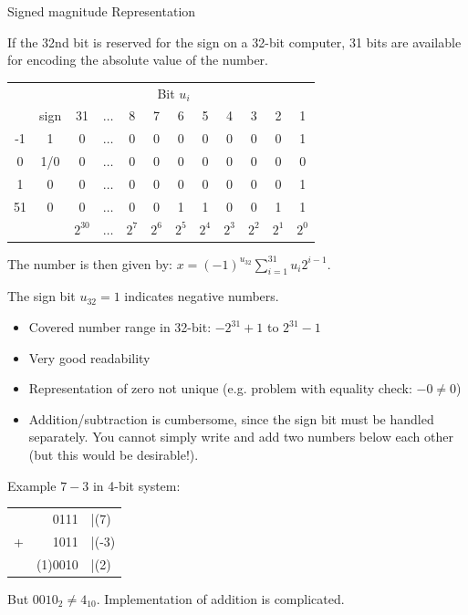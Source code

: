 \begin{vbframe}{Signed magnitude Representation}



If the 32nd bit is reserved for the sign on a 32-bit computer, 31 bits are available for encoding the absolute value of the number.

\begin{footnotesize}
\begin{center}
  \begin{tabular}{ c | ccccccccccc}
    & \multicolumn{11}{c}{Bit $u_i$} \\
    & sign & 31  & $\hdots$ & 8 & 7 & 6 & 5 & 4 & 3 & 2 & 1 \\
    \hline
    -1 & 1 & 0 & $\hdots$ & 0 & 0 & 0 & 0 & 0 & 0 & 0 & 1 \\
     0 & 1/0 & 0 & $\hdots$ & 0 & 0 & 0 & 0 & 0 & 0 & 0 & 0 \\
     1 & 0 & 0 & $\hdots$ & 0 & 0 & 0 & 0 & 0 & 0 & 0 & 1 \\
    51 & 0 & 0 & $\hdots$ & 0 & 0 & 1 & 1 & 0 & 0 & 1 & 1 \\
    \hline
      &  & $2^{30}$ & $\hdots$ & $2^7$ & $2^6$ & $2^5$ & $2^4$ & $2^3$ & $2^2$ & $2^1$ & $2^0$
  \end{tabular}
\end{center}
\end{footnotesize}

The number is then given by: $x = (-1)^{u_{32}}\sum_{i=1}^{31} u_i 2^{i-1}$.

The sign bit $u_{32} = 1$ indicates negative numbers.



\framebreak
\begin{itemize}
  \item Covered number range in 32-bit: $-2^{31}+1$ to $2^{31}-1$
  \item Very good readability
  \item Representation of zero not unique (e.g. problem with equality check: $-0 \neq 0$)
  \item Addition/subtraction is cumbersome, since the sign bit must be handled separately. You cannot simply write and add two numbers below each other (but this would be desirable!).
\end{itemize}
Example $7 - 3$ in 4-bit system:

\begin{center}
  \begin{tabular}{crl}
    &0111 &|(7)\\
    +&1011 &|(-3)\\\hline
    &(1)0010 &|(2)
  \end{tabular}
\end{center}

But $0010_2 \neq 4_{10}$. Implementation of addition is complicated.
\end{vbframe}


